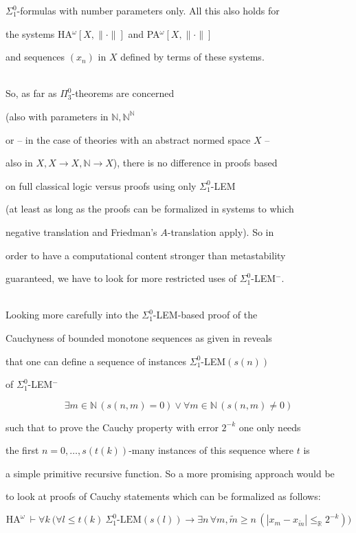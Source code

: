 \documentclass[1p]{elsarticle}
\newcommand{\RR}{\ensuremath{\mathbb{R}}}
\newcommand{\NN}{\ensuremath{\mathbb{N}}}
\theoremstyle{plain}
\theoremstyle{definition}
\theoremstyle{remark}
\theoremstyle{definition}
\begin{document}
$\Sigma^0_1$-formulas with number parameters only. All this also holds for 

the systems HA$^{\omega}[X,\|\cdot\|]$ and PA$^{\omega}[X,\|\cdot\|]$ 

and sequences $(x_n)$ in $X$ defined by terms of these systems.

\\[2mm] 

So, as far as $\Pi^0_3$-theorems are concerned 

(also with parameters in $\NN,\NN^{\NN}$ 

or -- in the case of theories with an abstract normed space $X$ -- 

also in $X,X\to X, \NN\to X$), there is no difference in proofs based 

on full classical logic versus proofs using only $\Sigma^0_1$-LEM 

(at least as long as the proofs can be formalized in systems to which 

negative translation and Friedman's $A$-translation apply). So in 

order to have a computational content stronger than metastability 

guaranteed, we have to look for more restricted uses of $\Sigma^0_1$-LEM$^-.$  

\\  

Looking more carefully into the $\Sigma^0_1$-LEM-based proof of the 

Cauchyness of bounded monotone sequences as given in \cite{Toftdal} reveals 

that one can define a sequence of instances $\Sigma^0_1$-LEM$(s(n))$ 

of $\Sigma^0_1$-LEM$^-$ 

\[ \exists m\in\NN \,(s(n,m)=0)\vee \forall m\in\NN\,(s(n,m)\not= 0) \] 

such that to prove the Cauchy property with error $2^{-k}$ one only needs 

the first $n=0,\ldots,s(t(k))$-many instances of this sequence where $t$ is 

a simple primitive recursive function. So a more promising approach would be

to look at proofs of Cauchy statements which can be formalized as follows:

\[ \mbox{HA}^{\omega}\ \vdash \forall k \  \big( \forall l\le t(k) \ 

\Sigma^0_1\mbox{-LEM}(s(l))\to \exists n\,\forall m,\tilde{m}\ge n\,

(|x_m-x_{\tilde{m}}|\le_{\RR} 2^{-k})\big) \] 
\end{document}
